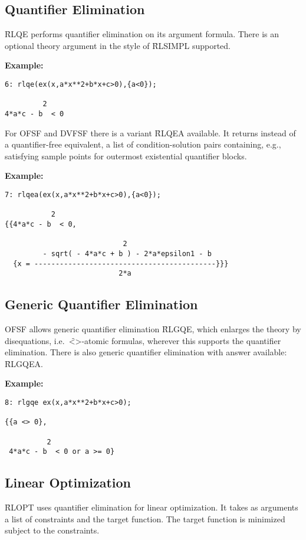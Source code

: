 \subsection{Quantifier Elimination}
\f{RLQE} performs quantifier elimination on its argument
formula. There is an optional theory argument in the style of
\f{RLSIMPL} supported.

\begin{samepage}
\vspace{0.5cm}
{\bf Example:}
\begin{verbatim}
6: rlqe(ex(x,a*x**2+b*x+c>0),{a<0});

         2
4*a*c - b  < 0
\end{verbatim}
\end{samepage}

For \textsc{OFSF} and \textsc{DVFSF} there is a variant
\f{RLQEA} available. It returns instead of a
quantifier-free equivalent, a list of condition-solution pairs
containing, e.g., satisfying sample points for outermost existential
quantifier blocks.

\begin{samepage}
\vspace{0.5cm}
{\bf Example:}
\begin{verbatim}
7: rlqea(ex(x,a*x**2+b*x+c>0),{a<0});

           2
{{4*a*c - b  < 0,

                            2
         - sqrt( - 4*a*c + b ) - 2*a*epsilon1 - b
  {x = -------------------------------------------}}}
                           2*a
\end{verbatim}
\end{samepage}

\subsection{Generic Quantifier Elimination}
\textsc{OFSF} allows generic quantifier elimination
\f{RLGQE}, which enlarges the theory by disequations,
i.e.~\f{<>}-atomic formulas, wherever this supports the quantifier
elimination. There is also generic quantifier elimination with answer
available: \f{RLGQEA}.

\begin{samepage}
\vspace{0.5cm}
{\bf Example:}
\begin{verbatim}
8: rlgqe ex(x,a*x**2+b*x+c>0);

{{a <> 0},

          2
 4*a*c - b  < 0 or a >= 0}
\end{verbatim}
\end{samepage}

\subsection{Linear Optimization}
\f{RLOPT} uses quantifier elimination for linear
optimization. It takes as arguments a list of constraints and the
target function. The target function is minimized subject to the
constraints.
